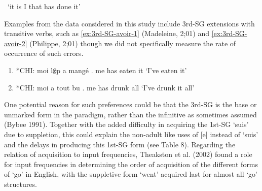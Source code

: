 \documentclass[
  12pt,
]{article}
\begin{document}
\begin{enumerate}[resume*]
\begin{enumerate}[resume*]
\begin{enumerate}[resume*]
\begin{enumerate}[resume*]
\begin{enumerate}[resume*]
\begin{enumerate}[resume*]
    \     `it is I that has done it'
\end{enumerate}

Examples from the data considered in this study include 3rd-SG extensions with transitive verbs, such as \ref{ex:3rd-SG-avoir-1} (Madeleine, 2;01) and \ref{ex:3rd-SG-avoir-2} (Philippe, 2;01) though we did not specifically measure the rate of occurrence of such errors.

\begin{enumerate}[resume*]
  \item{*CHI: moi l\verb+@+p a mangé .  \label{ex:3rd-SG-avoir-1}} \newline
             me has eaten it \newline
             `I've eaten it'
  \item{*CHI:   moi a tout bu . \label{ex:3rd-SG-avoir-2}} \newline
             me has drunk all \newline
             `I've drunk it all'
\end{enumerate}

One potential reason for such preferences could be that the 3rd-SG is the base or unmarked form in the paradigm, rather than the infinitive as sometimes assumed (Bybee 1991). Together with the added difficulty in acquiring the 1st-SG `suis' due to suppletion, this could explain the non-adult like uses of {[}e{]} instead of `suis' and the delays in producing this 1st-SG form (see Table 8). Regarding the relation of acquisition to input frequencies, Theakston et al. (2002) found a role for input frequencies in determining the order of acquisition of the different forms of `go' in English, with the suppletive form `went' acquired last for almost all `go' structures.


\end{enumerate}
\end{enumerate}
\end{enumerate}
\end{enumerate}
\end{enumerate}
\end{document}
